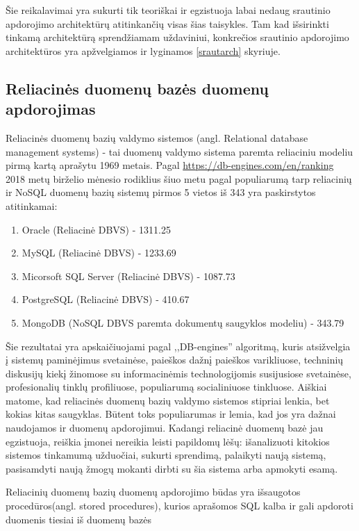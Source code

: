 \documentclass{VUMIFPSkursinis}
\begin{document}
        Šie reikalavimai yra sukurti tik teoriškai ir egzistuoja labai nedaug srautinio apdorojimo architektūrų atitinkančių visas šias taisykles. Tam kad išsirinkti tinkamą architektūrą sprendžiamam uždaviniui, 
        konkrečios srautinio apdorojimo architektūros yra apžvelgiamos ir lyginamos \ref{srautarch} skyriuje.

\subsection{Reliacinės duomenų bazės duomenų apdorojimas}

    Reliacinės duomenų bazių valdymo sistemos (angl. Relational database management systems) - tai duomenų valdymo sistema paremta reliaciniu modeliu pirmą kartą aprašytu 1969 metais\cite{codd1969derivability}.
    Pagal \url{https://db-engines.com/en/ranking} 2018 metų birželio mėnesio rodiklius šiuo metu pagal populiarumą tarp reliacinių ir NoSQL duomenų bazių sistemų pirmos 5 vietos iš 343 yra paskirstytos atitinkamai:
    \begin{enumerate}
        \item Oracle (Reliacinė DBVS) - 1311.25
        \item MySQL (Reliacinė DBVS) - 1233.69
        \item Micorsoft SQL Server (Reliacinė DBVS) - 1087.73
        \item PostgreSQL (Reliacinė DBVS) - 410.67
        \item MongoDB (NoSQL DBVS paremta dokumentų saugyklos modeliu) - 343.79
    \end{enumerate}\par
        Šie rezultatai yra apskaičiuojami pagal ,,DB-engines'' algoritmą, kuris atsižvelgia į sistemų paminėjimus svetainėse, paieškos dažnį paieškos varikliuose, techninių diskusijų kiekį
       žinomose su informacinėmis technologijomis susijusiose svetainėse, profesionalių tinklų profiliuose, populiarumą socialiniuose tinkluose\cite{dbengines}. Aiškiai matome, kad reliacinės
    duomenų bazių valdymo sistemos stipriai lenkia, bet kokias kitas saugyklas. Būtent toks populiarumas ir lemia, kad jos yra dažnai naudojamos ir duomenų apdorojimui. Kadangi reliacinė
    duomenų bazė jau egzistuoja, reiškia įmonei nereikia leisti papildomų lėšų: išanalizuoti kitokios sistemos tinkamumą užduočiai, sukurti sprendimą, palaikyti naują sistemą, 
    pasisamdyti naują žmogų mokanti dirbti su šia sistema arba apmokyti esamą. \par
        Reliacinių duomenų bazių duomenų apdorojimo būdas yra išsaugotos procedūros(angl. stored procedures), kurios aprašomos SQL kalba ir gali apdoroti duomenis tiesiai iš duomenų bazės 
\end{document}
